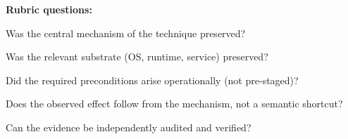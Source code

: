 \noindent\textbf{Rubric questions:}
\begin{description}[nosep,leftmargin=1em]
  \item[Q1] Was the central mechanism of the technique preserved?
  \item[Q2] Was the relevant substrate (OS, runtime, service) preserved?
  \item[Q3] Did the required preconditions arise operationally (not pre-staged)?
  \item[Q4] Does the observed effect follow from the mechanism, not a semantic shortcut?
  \item[Q5] Can the evidence be independently audited and verified?
\end{description}